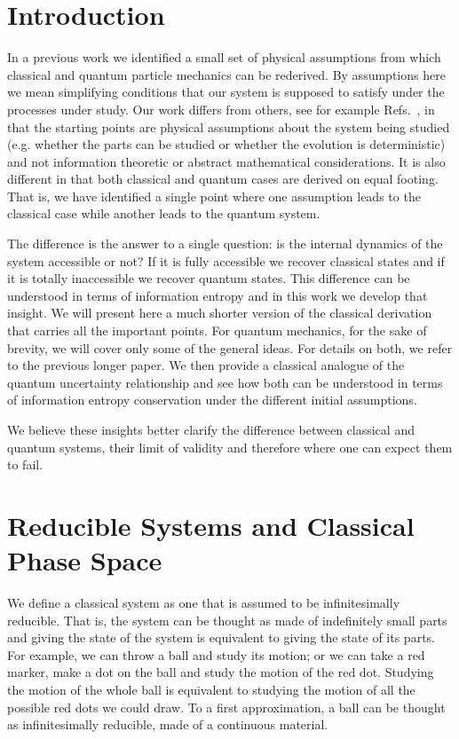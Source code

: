 \documentclass{ws-ijqi}
\begin{document}
\section{Introduction}
In a previous work\cite{Carc1} we identified a small set of physical assumptions from which classical and quantum particle mechanics can be rederived. By assumptions here we mean simplifying conditions that our system is supposed to satisfy under the processes under study. Our work differs from others, see for example Refs.~, in that the starting points are physical assumptions about the system being studied (e.g. whether the parts can be studied or whether the evolution is deterministic) and not information theoretic or abstract mathematical considerations. It is also different in that both classical and quantum cases are derived on equal footing. That is, we have identified a single point where one assumption leads to the classical case while another leads to the quantum system.

The difference is the answer to a single question: is the internal dynamics of the system accessible or not? If it is fully accessible we recover classical states and if it is totally inaccessible we recover quantum states. This difference can be understood in terms of information entropy and in this work we develop that insight. We will present here a much shorter version of the classical derivation that carries all the important points. For quantum mechanics, for the sake of brevity, we will cover only some of the general ideas. For details on both, we refer to the previous longer paper\cite{Carc1}. We then provide a classical analogue of the quantum uncertainty relationship and see how both can be understood in terms of information entropy conservation under the different initial assumptions.

We believe these insights better clarify the difference between classical and quantum systems, their limit of validity and therefore where one can expect them to fail.

\section{Reducible Systems and Classical Phase Space}
We define a classical system as one that is assumed to be infinitesimally reducible. That is, the system can be thought as made of indefinitely small parts and giving the state of the system is equivalent to giving the state of its parts. For example, we can throw a ball and study its motion; or we can take a red marker, make a dot on the ball and study the motion of the red dot. Studying the motion of the whole ball is equivalent to studying the motion of all the possible red dots we could draw. To a first approximation, a ball can be thought as infinitesimally reducible, made of a continuous material.
\end{document}

